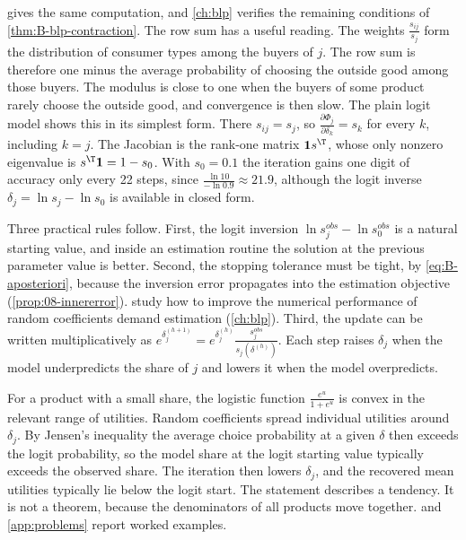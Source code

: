  gives the same computation, and \cref{ch:blp} verifies the remaining conditions of
\cref{thm:B-blp-contraction}. The row sum has a useful reading. The weights $\frac{s_{ij}}{s_j}$ form the
distribution of consumer types among the buyers of $j$. The row sum is therefore one minus the average
probability of choosing the outside good among those buyers. The modulus is close to one when the buyers of
some product rarely choose the outside good, and convergence is then slow. The plain logit model shows this in
its simplest form. There $s_{ij} = s_j$, so $\frac{\partial\Phi_j}{\partial\delta_k} = s_k$ for every $k$,
including $k = j$. The Jacobian is the rank-one matrix $\mathbf{1}s^\T$, whose only nonzero eigenvalue is
$s^\T\mathbf{1} = 1 - s_0$. With $s_0 = 0.1$ the iteration gains one digit of accuracy only every 22 steps,
since $\frac{\ln 10}{-\ln 0.9} \approx 21.9$, although the logit inverse $\delta_j = \ln s_j - \ln s_0$ is
available in closed form.

Three practical rules follow. First, the logit inversion $\ln s^{obs}_j - \ln s^{obs}_0$ is a natural
starting value, and inside an estimation routine the solution at the previous parameter value is better.
Second, the stopping tolerance must be tight, by \eqref{eq:B-aposteriori}, because the inversion error
propagates into the estimation objective (\cref{prop:08-innererror}). \citet{DubeFoxSu2012} study how to improve
the numerical performance of random coefficients demand estimation (\cref{ch:blp}).
Third, the update can be written
multiplicatively as $e^{\delta^{(h+1)}_j} = e^{\delta^{(h)}_j}\frac{s^{obs}_j}{s_j(\delta^{(h)})}$. Each step
raises $\delta_j$ when the model underpredicts the share of $j$ and lowers it when the model overpredicts.

\begin{remark}\label{rem:B-logit-start}
For a product with a small share, the logistic function $\frac{e^{u}}{1 + e^{u}}$ is convex in the relevant
range of utilities. Random coefficients spread individual utilities around $\delta_j$. By Jensen's
inequality the average choice probability at a given $\delta$ then exceeds the logit probability, so the
model share at the logit starting value typically exceeds the observed share. The iteration then lowers
$\delta_j$, and the recovered mean utilities typically lie below the logit start. The statement describes a
tendency. It is not a theorem, because the denominators of all products move together.  and \cref{app:problems}
report worked examples.
\end{remark}


